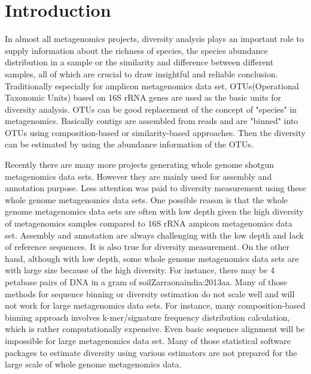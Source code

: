 \documentclass{article}
\begin{document}
\tableofcontents


\section{Introduction}

In almost all  metagenomics projects, diversity analysis plays an important
role to supply information about the richness of species, the species abundance
distribution in a sample or the similarity and difference between different 
samples, all of which are crucial to draw insightful and reliable conclusion. 
Traditionally especially for amplicon metagenomics data set, OTUs(Operational 
Taxonomic Units) based on 16S rRNA genes are used as the basic units for 
diversity analysis. OTUs can be good replacement of the concept of "species" in 
metagenomics. Basically contigs are assembled from reads and are "binned" into
OTUs using composition-based or similarity-based approaches. Then the diversity
can be estimated by using the abundance information of the OTUs.

Recently there are many more projects generating whole genome shotgun metagenomics data sets. However they are 
mainly used for assembly and annotation purpose. Less attention was paid to diversity measurement
using these whole genome metagenomics data sets. One possible reason is that the whole genome metagenomics
data sets are often with low depth given the high diversity of metagenomics samples compared to 16S rRNA
ampicon metagenomics data set. Assembly and annotation are always challenging with the low depth and lack of 
reference sequences. It is also true for diversity measurement. On the other hand, although with low depth, some whole genome metagenomics 
data sets are with large size because of the high diversity. For instance, there may be 4 petabase
pairs of DNA in a gram of soil{Zarraonaindia:2013aa}. Many of those methods for sequence binning or diversity 
estimation do not scale well and will not work for large metagenomics data sets. For instance,
many composition-based binning approach involves k-mer/signature frequency distribution calculation, which is 
rather computationally expensive. Even basic sequence alignment will be impossible for large metagenomics data set.
Many of those statistical software packages to estimate diversity using various estimators are not prepared 
for the large scale of whole genome metagenomics data. 
\end{document}
